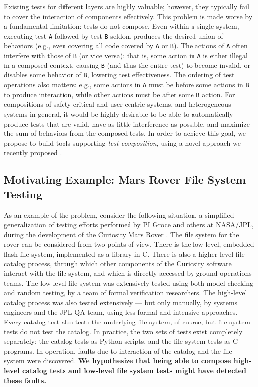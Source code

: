 \documentclass[12pt]{article}
\begin{document}
Existing tests for different layers are highly valuable; however, they typically fail to cover the interaction of components effectively.  This problem is made worse by a fundamental limitation: tests do not compose.  Even within a single system, executing test {\tt A} followed by test {\tt B} seldom produces the desired union of behaviors (e.g., even covering all code covered by {\tt A} or {\tt B}).  The actions of {\tt A} often interfere with those of {\tt B} (or vice versa): that is, some action in {\tt A} is either illegal in a composed context, causing {\tt B} (and thus the entire test) to become invalid, or disables some behavior of {\tt B}, lowering test effectiveness.  The ordering of test operations also matters: e.g., some actions in {\tt A} must be before some actions in {\tt B} to produce interaction, while other actions must be after some {\tt B} action.  For compositions of safety-critical and user-centric systems, and heterogeneous systems in general, it would be highly desirable to be able to automatically produce tests that are valid, have as little interference as possible, and maximize the sum of behaviors from the composed tests.  In order to achieve this goal, we propose to build tools supporting \emph{test composition}, using a novel approach we recently proposed \cite{tecpscompose}.

\subsection{Motivating Example: Mars Rover File System Testing}

As an example of the problem, consider the following situation, a simplified generalization of testing efforts performed by PI Groce and others at NASA/JPL, during the development of the Curiosity Mars Rover \cite{AMAI}.  The file system for the rover can be considered from two points of view.  There is the low-level, embedded flash file system, implemented as a library in C.  There is also a higher-level file catalog process, through which other components of the Curiosity software interact with the file system, and which is directly accessed by ground operations teams.  The low-level file system was extensively tested using both model checking and random testing, by a team of formal verification researchers.  The high-level catalog process was also tested extensively --- but only manually, by systems engineers and the JPL QA team, using less formal and intensive approaches.  Every catalog test also tests the underlying file system, of course, but file system tests do not test the catalog.  In practice, the two sets of tests exist completely separately: the catalog tests as Python scripts, and the file-system tests as C programs.  In operation, faults due to interaction of the catalog and the file system were discovered.  \textbf{We hypothesize that being able to compose high-level catalog tests and low-level file system tests might have detected these faults.}
\end{document}
